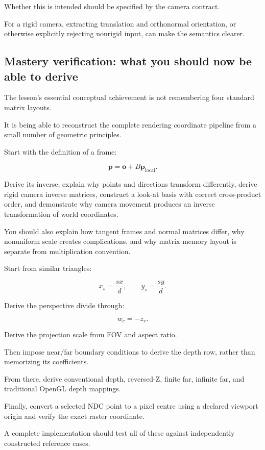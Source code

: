 Whether this is intended should be specified by the camera contract.

For a rigid camera, extracting translation and orthonormal orientation, or otherwise explicitly rejecting nonrigid input, can make the semantics clearer.

\subsection{Mastery verification: what you should now be able to derive}\label{02-foundations-ii-ch037-mastery-verification-what-you-should-now-be-able-to-derive}

The lesson's essential conceptual achievement is not remembering four standard matrix layouts.

It is being able to reconstruct the complete rendering coordinate pipeline from a small number of geometric principles.

Start with the definition of a frame:

\[
 \mathbf p=\mathbf o+B\mathbf p_{\mathrm{local}}.
\]

Derive its inverse, explain why points and directions transform differently, derive rigid camera inverse matrices, construct a look-at basis with correct cross-product order, and demonstrate why camera movement produces an inverse transformation of world coordinates.

You should also explain how tangent frames and normal matrices differ, why nonuniform scale creates complications, and why matrix memory layout is separate from multiplication convention.

Start from similar triangles:

\[
 x_s=\frac{sx}{d}, \qquad y_s=\frac{sy}{d}.
\]

Derive the perspective divide through:

\[
 w_c=-z_v.
\]

Derive the projection scale from FOV and aspect ratio.

Then impose near/far boundary conditions to derive the depth row, rather than memorizing its coefficients.

From there, derive conventional depth, reversed-Z, finite far, infinite far, and traditional OpenGL depth mappings.

Finally, convert a selected NDC point to a pixel centre using a declared viewport origin and verify the exact raster coordinate.

A complete implementation should test all of these against independently constructed reference cases.

